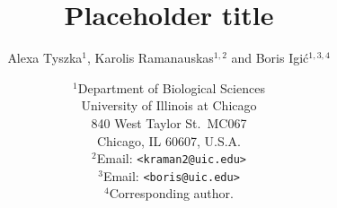 \documentclass[11pt,letterpaper,titlepage]{article}
\begin{document}
\title{\Large\bf{Placeholder title}}
\author{Alexa Tyszka$^{1}$, Karolis Ramanauskas$^{1,2}$ and Boris Igi\'{c}$^{1,3,4}$}
\date{
    $^1$Department of Biological Sciences\\
    University of Illinois at Chicago\\
    840 West Taylor St.\ MC067\\
    Chicago, IL 60607, U.S.A.\\
    [\baselineskip]
    $^2$Email: {\tt<kraman2@uic.edu>}\\
    $^3$Email: {\tt<boris@uic.edu>}\\
    $^4$Corresponding author.\\
}
\maketitle




\end{document}
